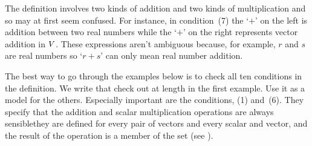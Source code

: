 \begin{remark}
The definition involves two kinds of addition and two kinds of multiplication
and so may at first seem confused.
For instance, in condition~(7)
the `$+$' on the left is addition between two real numbers
while the `$+$' on the right represents vector addition in
\( V\/ \).
These expressions aren't ambiguous because, for example,
\( r \) and \( s \)
are real numbers so `\( r+s \)' can only mean real number addition.
\end{remark}

The best way to go through the examples below is to
check all ten conditions in the definition.
We write that check out at length in the first example.
Use it as a model for the others.
Especially important are the 
conditions, (1) and~(6).
They specify that the addition and scalar multiplication operations
are always sensible\Dash they are defined for every pair of vectors 
and every scalar and vector,
and the result of the operation is a member of the set
(see ). 

